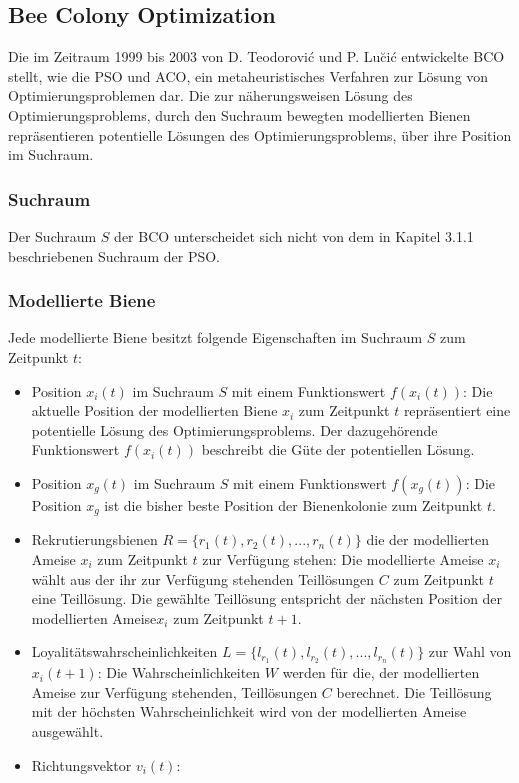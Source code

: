 \documentclass[a4paper, 11pt]{article}
\begin{document}
\subsection{Bee Colony Optimization}
Die im Zeitraum 1999 bis 2003 von D. Teodorovi\'{c} und P. Lu\u{c}i\'{c} entwickelte \ac{BCO} stellt, wie die \acs{PSO} und \acs{ACO}, ein metaheuristisches Verfahren zur Lösung von Optimierungsproblemen dar. Die zur näherungsweisen Lösung des Optimierungsproblems, durch den Suchraum bewegten modellierten Bienen repräsentieren potentielle Lösungen des Optimierungsproblems, über ihre Position im Suchraum. 
\subsubsection{Suchraum}
Der Suchraum $S$ der \acs{BCO} unterscheidet sich nicht von dem in Kapitel 3.1.1 beschriebenen Suchraum der \acs{PSO}. 
\subsubsection{Modellierte Biene}
Jede modellierte Biene besitzt folgende Eigenschaften im Suchraum $S$ zum Zeitpunkt $t$:
\begin{itemize}
	\item Position $x_{i}(t)$ im Suchraum $S$ mit einem Funktionswert $f(x_{i}(t))$: Die aktuelle Position der modellierten Biene $x_{i}$ zum Zeitpunkt $t$ repräsentiert eine potentielle Lösung des Optimierungsproblems. Der dazugehörende Funktionswert $f(x_{i}(t))$ beschreibt die Güte der potentiellen Lösung.
	\item Position $x_{g}(t)$ im Suchraum $S$ mit einem Funktionswert $f(x_{g}(t))$: Die Position $x_{g}$ ist die bisher beste Position der Bienenkolonie zum Zeitpunkt $t$.
	\item Rekrutierungsbienen  $R=\{r_{1}(t),r_{2}(t),...,r_{n}(t)\}$ die der modellierten Ameise $x_{i}$ zum Zeitpunkt $t$ zur Verfügung stehen: Die modellierte Ameise $x_{i}$ wählt aus der ihr zur Verfügung stehenden Teillösungen $C$ zum Zeitpunkt $t$ eine Teillösung. Die gewählte Teillösung entspricht der nächsten Position der modellierten Ameise$x_{i}$ zum Zeitpunkt $t+1$.
	\item Loyalitätswahrscheinlichkeiten $L=\{l_{r_{1}}(t),l_{r_{2}}(t),...,l_{r_{n}}(t)\}$  zur Wahl von $x_{i}(t+1)$: Die Wahrscheinlichkeiten $W$ werden für die, der modellierten Ameise zur Verfügung stehenden, Teillösungen $C$ berechnet. Die Teillösung mit der höchsten Wahrscheinlichkeit wird von der modellierten Ameise ausgewählt. 
	\item Richtungsvektor $v_{i}(t)$:
\end{itemize}
\end{document}
